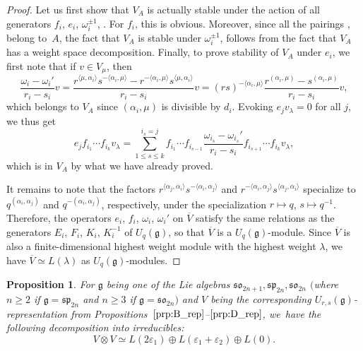 \documentclass[10pt,a4paper]{amsart}
\numberwithin{equation}{section}
\newtheorem{Proposition}[Theorem]{Proposition}
 { \theoremstyle{definition}
\newtheorem{Definition}[Theorem]{Definition}
\newtheorem{Note}[Theorem]{Note}
\newtheorem{Example}[Theorem]{Example}
\newtheorem{Remark}[Theorem]{Remark} }
\newcommand{\fg}{\mathfrak{g}}
\newcommand{\sso}{\mathfrak{so}}
\newcommand{\ssp}{\mathfrak{sp}}
\begin{document}
\begin{proof}
Let us first show that $V_{A}$ is actually stable under the action of all generators $f_{i}$, $e_{i}$, $\omega_{i}^{\pm 1}$, . For $f_{i}$, this is obvious. Moreover, since all the pairings ,  belong to~$A$, the fact that $V_{A}$ is stable under $\omega_{i}^{\pm 1}$,  follows from the fact that $V_{A}$ has a weight space decomposition. Finally, to prove stability of $V_A$ under $e_{i}$, we first note that if $v \in V_{\mu}$, then
\[
 \frac{\omega_{i} - \omega_{i}'}{r_i - s_i} v =
 \frac{r^{\langle \mu,\alpha_{i}\rangle}s^{-\langle \alpha_{i},\mu \rangle} - r^{-\langle \alpha_{i},\mu\rangle}s^{\langle \mu,\alpha_{i}\rangle}}{r_i - s_i} v =
 (rs)^{-\langle \alpha_{i},\mu\rangle}\frac{r^{(\alpha_{i},\mu)} - s^{(\alpha_{i},\mu)}}{r_i - s_i} v,
\]
which belongs to $V_{A}$ since $(\alpha_{i},\mu)$ is divisible by $d_i$. Evoking $e_{j}v_{\lambda} = 0$ for all $j$, we thus get
\[
 e_{j}f_{i_1}\cdots f_{i_k} v_{\lambda} =
 \sum_{1\leq s\leq k}^{i_s=j} f_{i_{1}} \cdots f_{i_{s-1}} \frac{\omega_{i_{s}} - \omega_{i_{s}}'}{r_i - s_i}
 f_{i_{s + 1}} \cdots f_{i_{k}} v_{\lambda},
\]
which is in $V_{A}$ by what we have already proved.


It remains to note that the factors $r^{\langle \alpha_{j},\alpha_{i}\rangle}s^{-\langle \alpha_{i},\alpha_{j}\rangle}$ and $r^{-\langle \alpha_{i},\alpha_{j}\rangle}s^{\langle \alpha_{j},\alpha_{i}\rangle}$ specialize to $q^{(\alpha_i,\alpha_j)}$ and $q^{-(\alpha_i,\alpha_j)}$, respectively, under the specialization $r\mapsto q$, $s\mapsto q^{-1}$. Therefore, the operators $e_{i}$, $f_{i}$, $\omega_{i}$, $\omega_{i}'$ on $\overline{V}$ satisfy the same relations as the generators $E_{i}$, $F_{i}$, $K_{i}$, $K_{i}^{-1}$ of $U_{q}(\fg)$, so that $\overline{V}$ is a $U_{q}(\mathfrak{g})$-module. Since $\overline{V}$ is also a finite-dimensional highest weight module with the highest weight $\lambda$, we have $\overline{V} \simeq L(\lambda)$ as $U_{q}(\fg)$-modules.
\end{proof}


\begin{Proposition}\label{prop:struct}
For $\fg$ being one of the Lie algebras $\sso_{2n + 1}, \ssp_{2n}, \sso_{2n}$ $($where $n \geq 2$ if $\fg=\mathfrak{sp}_{2n}$ and $n\geq 3$ if $\fg=\mathfrak{so}_{2n})$ and $V$ being the corresponding $U_{r,s}(\fg)$-representation from Propositions~$\ref{prp:B_rep}$--$\ref{prp:D_rep}$, we~have the following decomposition into irreducibles:
\begin{equation}\label{eq:irr-decomp}
 V \otimes V \simeq L(2\varepsilon_{1})\oplus L(\varepsilon_{1} + \varepsilon_{2}) \oplus L(0).
\end{equation}
\end{Proposition}
\end{document}
